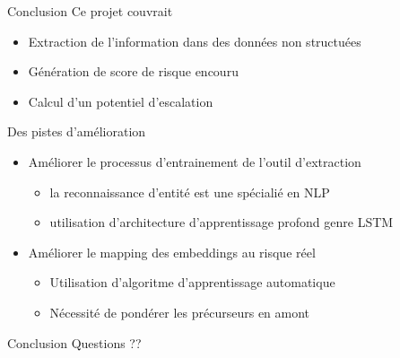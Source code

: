 
\begin{frame}[label=conclusion]{Conclusion}
	Ce projet couvrait
	\begin{itemize}
	\item Extraction de l'information dans des données non structuées
	\item Génération de score de risque encouru
	\item Calcul d'un potentiel d'escalation	
	\end{itemize}

	Des pistes d'amélioration
	\begin{itemize}
		\item Améliorer le processus d'entrainement de l'outil d'extraction
		\begin{itemize}
			\item la reconnaissance d'entité est une spécialié en NLP
			\item utilisation d'architecture d'apprentissage profond genre LSTM
		\end{itemize}
		
		\item Améliorer le mapping des embeddings au risque réel 
		\begin{itemize}
			\item Utilisation d'algoritme d'apprentissage automatique
			\item Nécessité de pondérer les précurseurs en amont 
		\end{itemize}
	
	
	\end{itemize}

	\end{frame}

\begin{frame}[label=conclusion]{Conclusion}
Questions ??
	\end{frame}
